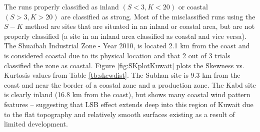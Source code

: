  The runs properly classified as inland $(S < 3, K < 20)$ or coastal $(S > 3, K > 20)$ are classified as strong.   Most of the misclassified runs using the $S-K$ method are sites that are situated in an inland or coastal area, but are not properly classified (a site in an inland area classified as coastal and vice versa).  The Shuaibah Industrial Zone - Year 2010, is located 2.1 km from the coast and is considered coastal due to its physical location and that 2 out of 3 trials classified the zone as coastal. Figure \ref{fig:SKplotKuwait} plots the Skewness vs. Kurtosis values from Table \ref{tb:skewdist}. The Subhan site is 9.3 km from the coast and near the border of a coastal zone and a production zone. The Kabd site is clearly inland (16.8 km from the coast), but shows many coastal wind pattern features – suggesting that LSB effect extends deep into this region of Kuwait due to the flat topography and relatively smooth surfaces existing as a result of limited development.
%
